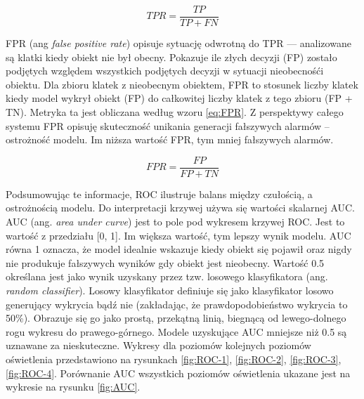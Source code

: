 \begin{equation}
    TPR = \frac{TP}{TP + FN}
    \label{eq:TPR}
\end{equation}

FPR (ang \emph{false positive rate}) opisuje sytuację odwrotną do TPR --- analizowane są klatki kiedy obiekt nie był obecny. Pokazuje ile złych decyzji (FP) zostało podjętych względem wszystkich podjętych decyzji w sytuacji nieobecnośći obiektu. Dla zbioru klatek z nieobecnym obiektem, FPR to stosunek liczby klatek kiedy model wykrył obiekt (FP) do całkowitej liczby klatek z tego zbioru (FP + TN). Metryka ta jest obliczana według wzoru \ref{eq:FPR}. Z perspektywy całego systemu FPR opisuję skuteczność unikania generacji fałszywych alarmów -- ostrożność modelu. Im niższa wartość FPR, tym mniej fałszywych alarmów.


\begin{equation}
    FPR = \frac{FP}{FP + TN}
    \label{eq:FPR}
\end{equation}

Podsumowując te informacje, ROC ilustruje balans między czułością, a ostrożnością modelu. Do interpretacji krzywej używa się wartości skalarnej AUC. AUC (ang. \emph{area under curve}) jest to pole pod wykresem krzywej ROC. Jest to wartość z przedziału [0, 1]. Im większa wartość, tym lepszy wynik modelu. AUC równa 1 oznacza, że model idealnie wskazuje kiedy obiekt się pojawił oraz nigdy nie produkuje fałszywych wyników gdy obiekt jest nieobecny. Wartość 0.5 określana jest jako wynik uzyskany przez tzw. losowego klasyfikatora (ang. \emph{random classifier}). Losowy klasyfikator definiuje się jako klasyfikator losowo generujący wykrycia bądź nie (zakładając, że prawdopodobieństwo wykrycia to 50\%). Obrazuje się go jako prostą, przekątną linią, biegnącą od lewego-dolnego rogu wykresu do prawego-górnego. Modele uzyskujące AUC mniejsze niż 0.5 są uznawane za nieskuteczne. 
Wykresy dla poziomów kolejnych poziomów oświetlenia przedstawiono na rysunkach \ref{fig:ROC-1}, \ref{fig:ROC-2}, \ref{fig:ROC-3}, \ref{fig:ROC-4}. Porównanie AUC wszystkich poziomów oświetlenia ukazane jest na wykresie na rysunku \ref{fig:AUC}.



